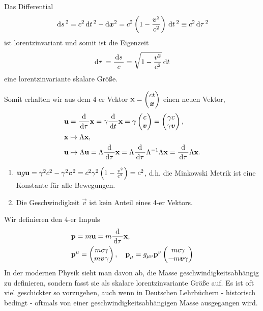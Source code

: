 Das Differential
\begin{align*}
\,\mathrm{d} s\,^2 = c^2\,\mathrm{d} t\,^2 - \mathrm{d}\bm{x}^2 =
c^2\left(1-\frac{\bm{v}^2}{c^2}\right)\,\mathrm{d} t\,^2 \equiv c^2\,\mathrm{d} \tau\,^2
\end{align*}
ist lorentzinvariant und somit ist die Eigenzeit
\begin{align*}
\,\mathrm{d} \tau\, = \frac{\,\mathrm{d} s\,}{c} = \sqrt{1-\frac{v^2}{c^2}}\,\mathrm{d} t\,
\end{align*}
eine lorentzinvariante skalare Größe.

Somit erhalten wir aus dem $4$-er Vektor $\bm{\mathrm{x}} = \begin{pmatrix}ct \\
\bm{x}\end{pmatrix}$ einen neuen Vektor,
\begin{align*}
&\bm{\mathrm{u}} = \frac{\mathrm{d}}{\,\mathrm{d} \tau\,}\bm{\mathrm{x}} = \gamma \frac{\mathrm{d}}{\,\mathrm{d} t\,}\bm{\mathrm{x}} =
\gamma\begin{pmatrix}c \\ \bm{v}\end{pmatrix} = \begin{pmatrix} \gamma c \\
\gamma\bm{v}\end{pmatrix},\\
&\bm{\mathrm{x}} \mapsto \Lambda\bm{\mathrm{x}},\\
&\bm{\mathrm{u}} \mapsto \Lambda \bm{\mathrm{u}} = \Lambda \frac{\mathrm{d}}{\,\mathrm{d} \tau\,}\bm{\mathrm{x}} =
\Lambda \frac{\mathrm{d}}{\,\mathrm{d} \tau\,}\Lambda^{-1}\Lambda \bm{\mathrm{x}} =
\frac{\mathrm{d}}{\,\mathrm{d} \tau\,}\Lambda\bm{\mathrm{x}}.
\end{align*}
\begin{bemn}[Bemerkungen.]
\begin{enumerate}[label=\arabic{*}.)]
  \item $\bm{\mathrm{u}}g\bm{\mathrm{u}} = \gamma^2c^2 - \gamma^2\bm{v}^2 =
c^2\gamma^2\left(1-\frac{v^2}{c^2}\right) = c^2$, d.h. 
 die Minkowski Metrik ist eine Konstante für alle Bewegungen.
  \item  Die Geschwindigkeit $\vec{v}$ ist kein Anteil eines 4-er
  Vektors.\maphere
\end{enumerate}
\end{bemn}

Wir definieren den $4$-er Impuls
\begin{align*}
&\bm{\mathrm{p}} = m\bm{\mathrm{u}} = m\frac{\mathrm{d}}{\,\mathrm{d} \tau\,}\bm{\mathrm{x}},\\
&\bm{\mathrm{p}}^\mu = \begin{pmatrix}mc\gamma \\ m\bm{v}\gamma\end{pmatrix},\quad
\bm{\mathrm{p}}_\mu = g_{\mu\nu}\bm{\mathrm{p}}^\nu \begin{pmatrix}mc\gamma \\
-m\bm{v}\gamma\end{pmatrix}
\end{align*}
In der modernen Physik sieht man davon ab, die Masse geschwindigkeitsabhängig
zu definieren, sondern fasst sie als skalare lorentzinvariante Größe auf.
Es ist oft viel geschickter so vorzugehen, auch wenn in Deutschen Lehrbüchern -
historisch bedingt - oftmals von einer geschwindigkeitsabhängigen Masse
ausgegangen wird.

